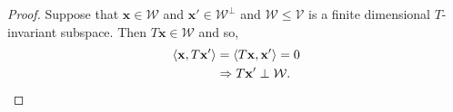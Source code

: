 \begin{proof}
 Suppose that $\mathbf{x} \in \mathcal{W}$ and
 $\mathbf{x}' \in \mathcal{W}^{\perp}$ and $\mathcal{W} \leq \mathcal{V}$
 is a finite dimensional $T$-invariant subspace.
 Then $T \mathbf{x} \in \mathcal{W}$ and so,
 \begin{align*}
  \langle \mathbf{x}, T \mathbf{x}' \rangle &=
  \langle T \mathbf{x}, \mathbf{x}' \rangle = 0
  \\
  & \Rightarrow  T \mathbf{x}' \perp \mathcal{W}. \qedhere
 \end{align*}
\end{proof}
